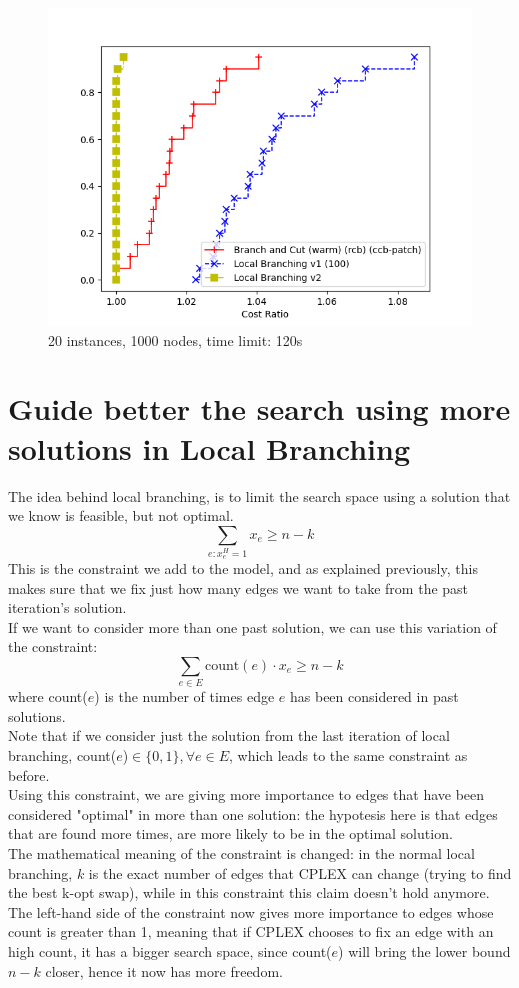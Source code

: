 \begin{figure}[h]
    \centering
    \includegraphics*[width=.6\textwidth]{../plots/perfprof_lb_costs.png}
    \caption*{20 instances, 1000 nodes, time limit: 120s}
\end{figure}

\newpage

\section{Guide better the search using more solutions in Local Branching}

The idea behind local branching, is to limit the search space using a solution that we know is feasible, but not optimal.\\
$$\sum_{e:x_e^H=1}x_e\geq n-k$$
This is the constraint we add to the model, and as explained previously, this makes sure that we fix just how many edges we want to take from the past iteration's solution.\\
If we want to consider more than one past solution, we can use this variation of the constraint:
$$\sum_{e\in E}\mbox{count}(e)\cdot x_e\geq n-k$$
where count($e$) is the number of times edge $e$ has been considered in past solutions.\\

Note that if we consider just the solution from the last iteration of local branching, count($e$)$\in\{0,1\},\forall e\in E$, which leads to the same constraint as before.\\

Using this constraint, we are giving more importance to edges that have been considered "optimal" in more than one solution: the hypotesis here is that edges that are found more times, are more likely to be in the optimal solution.\\

The mathematical meaning of the constraint is changed: in the normal local branching, $k$ is the exact number of edges that CPLEX can change (trying to find the best k-opt swap), while in this constraint this claim doesn't hold anymore. The left-hand side of the constraint now gives more importance to edges whose count is greater than 1, meaning that if CPLEX chooses to fix an edge with an high count, it has a bigger search space, since count($e$) will bring the lower bound $n-k$ closer, hence it now has more freedom.\\

